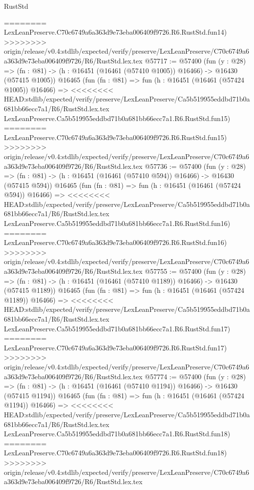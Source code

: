\begin{lexlean}{RustStd}
\begin{coremodule}
{\begin{coremodule}
{{{{{{{{{{{{{{{{{{{{{{{{{{{{{{{{{{{{{{{{{{{{{{{{{{{{{{{========
    LexLeanPreserve.C70c6749a6a363d9e73eba006409f9726.R6.RustStd.fun14)
>>>>>>>> origin/release/v0.4:stdlib/expected/verify/preserve/LexLeanPreserve/C70c6749a6a363d9e73eba006409f9726/R6/RustStd.lex.tex
@57717 := @57400
    (fun (y : @28) =>
    (fn : @81) -> (h : @16451 (@16461 (@57410 @1005)) @16466) -> @16430 (@57415 @1005))
    @16465
    (fun (fn : @81) =>
    fun (h : @16451 (@16461 (@57424 @1005)) @16466) =>
<<<<<<<< HEAD:stdlib/expected/verify/preserve/LexLeanPreserve/Ca5b519955eddbd71b0a681bb66ecc7a1/R6/RustStd.lex.tex
    LexLeanPreserve.Ca5b519955eddbd71b0a681bb66ecc7a1.R6.RustStd.fun15)
========
    LexLeanPreserve.C70c6749a6a363d9e73eba006409f9726.R6.RustStd.fun15)
>>>>>>>> origin/release/v0.4:stdlib/expected/verify/preserve/LexLeanPreserve/C70c6749a6a363d9e73eba006409f9726/R6/RustStd.lex.tex
@57736 := @57400
    (fun (y : @28) =>
    (fn : @81) -> (h : @16451 (@16461 (@57410 @594)) @16466) -> @16430 (@57415 @594))
    @16465
    (fun (fn : @81) =>
    fun (h : @16451 (@16461 (@57424 @594)) @16466) =>
<<<<<<<< HEAD:stdlib/expected/verify/preserve/LexLeanPreserve/Ca5b519955eddbd71b0a681bb66ecc7a1/R6/RustStd.lex.tex
    LexLeanPreserve.Ca5b519955eddbd71b0a681bb66ecc7a1.R6.RustStd.fun16)
========
    LexLeanPreserve.C70c6749a6a363d9e73eba006409f9726.R6.RustStd.fun16)
>>>>>>>> origin/release/v0.4:stdlib/expected/verify/preserve/LexLeanPreserve/C70c6749a6a363d9e73eba006409f9726/R6/RustStd.lex.tex
@57755 := @57400
    (fun (y : @28) =>
    (fn : @81) -> (h : @16451 (@16461 (@57410 @1189)) @16466) -> @16430 (@57415 @1189))
    @16465
    (fun (fn : @81) =>
    fun (h : @16451 (@16461 (@57424 @1189)) @16466) =>
<<<<<<<< HEAD:stdlib/expected/verify/preserve/LexLeanPreserve/Ca5b519955eddbd71b0a681bb66ecc7a1/R6/RustStd.lex.tex
    LexLeanPreserve.Ca5b519955eddbd71b0a681bb66ecc7a1.R6.RustStd.fun17)
========
    LexLeanPreserve.C70c6749a6a363d9e73eba006409f9726.R6.RustStd.fun17)
>>>>>>>> origin/release/v0.4:stdlib/expected/verify/preserve/LexLeanPreserve/C70c6749a6a363d9e73eba006409f9726/R6/RustStd.lex.tex
@57774 := @57400
    (fun (y : @28) =>
    (fn : @81) -> (h : @16451 (@16461 (@57410 @1194)) @16466) -> @16430 (@57415 @1194))
    @16465
    (fun (fn : @81) =>
    fun (h : @16451 (@16461 (@57424 @1194)) @16466) =>
<<<<<<<< HEAD:stdlib/expected/verify/preserve/LexLeanPreserve/Ca5b519955eddbd71b0a681bb66ecc7a1/R6/RustStd.lex.tex
    LexLeanPreserve.Ca5b519955eddbd71b0a681bb66ecc7a1.R6.RustStd.fun18)
========
    LexLeanPreserve.C70c6749a6a363d9e73eba006409f9726.R6.RustStd.fun18)
>>>>>>>> origin/release/v0.4:stdlib/expected/verify/preserve/LexLeanPreserve/C70c6749a6a363d9e73eba006409f9726/R6/RustStd.lex.tex
}}}}}}}}}}}}}}}}}}}}}}}}}}}}}}}}}}}}}}}}}}}}}}}}}}}}}}}
\end{coremodule}}
\end{coremodule}
\end{lexlean}
